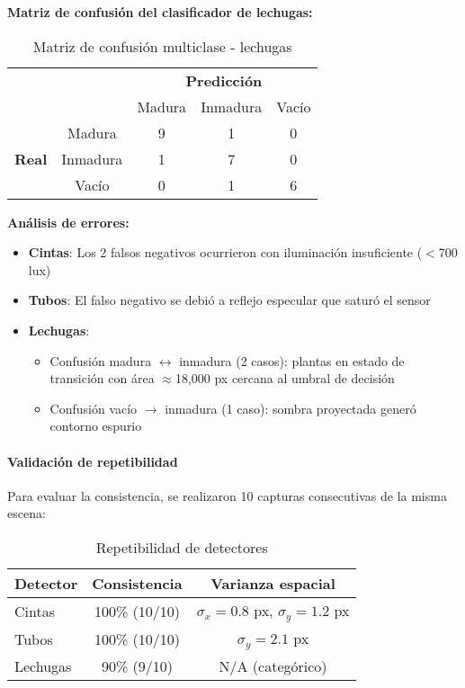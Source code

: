 \begin{enumerate}
\textbf{Matriz de confusión del clasificador de lechugas:}

\begin{table}[H]
\centering
\begin{tabular}{cc|c|c|c|}
\cline{3-5}
& & \multicolumn{3}{c|}{\textbf{Predicción}} \\ \cline{3-5}
& & Madura & Inmadura & Vacío \\ \hline
\multicolumn{1}{|c|}{\multirow{3}{*}{\textbf{Real}}} & Madura & 9 & 1 & 0 \\ \cline{2-5}
\multicolumn{1}{|c|}{} & Inmadura & 1 & 7 & 0 \\ \cline{2-5}
\multicolumn{1}{|c|}{} & Vacío & 0 & 1 & 6 \\ \hline
\end{tabular}
\caption{Matriz de confusión multiclase - lechugas}
\label{tab:confusion_lechugas}
\end{table}

\noindent
\textbf{Análisis de errores:}
\begin{itemize}[label=$\bullet$]
    \item \textbf{Cintas}: Los 2 falsos negativos ocurrieron con iluminación insuficiente ($<$700 lux)
    \item \textbf{Tubos}: El falso negativo se debió a reflejo especular que saturó el sensor
    \item \textbf{Lechugas}: 
    \begin{itemize}
        \item Confusión madura $\leftrightarrow$ inmadura (2 casos): plantas en estado de transición con área $\approx$18,000 px cercana al umbral de decisión
        \item Confusión vacío $\rightarrow$ inmadura (1 caso): sombra proyectada generó contorno espurio
    \end{itemize}
\end{itemize}

\paragraph{Validación de repetibilidad}
Para evaluar la consistencia, se realizaron 10 capturas consecutivas de la misma escena:

\begin{table}[H]
\centering
\begin{tabular}{|l|c|c|}
\hline
\textbf{Detector} & \textbf{Consistencia} & \textbf{Varianza espacial} \\ \hline
Cintas & 100\% (10/10) & $\sigma_x = 0.8$ px, $\sigma_y = 1.2$ px \\ \hline
Tubos & 100\% (10/10) & $\sigma_y = 2.1$ px \\ \hline
Lechugas & 90\% (9/10) & N/A (categórico) \\ \hline
\end{tabular}
\caption{Repetibilidad de detectores}
\label{tab:repetibilidad}
\end{table}


\end{enumerate}
